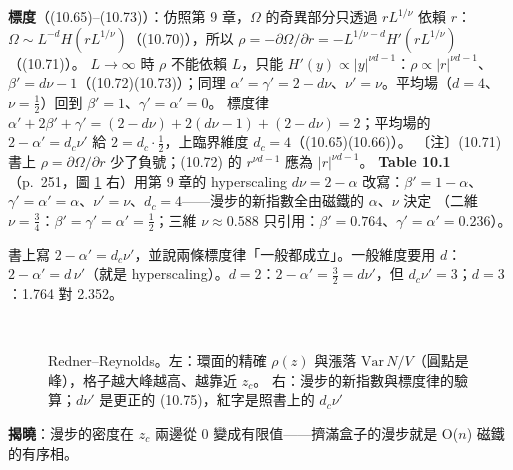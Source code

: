 \textbf{標度}（(10.65)--(10.73)）：仿照第 9 章，$\Omega$ 的奇異部分只透過 $rL^{1/\nu}$ 依賴 $r$：$\Omega\sim L^{-d}H(rL^{1/\nu})$（(10.70)），所以 $\rho=-\partial\Omega/\partial r=-L^{1/\nu-d}H'(rL^{1/\nu})$（(10.71)）。
$L\to\infty$ 時 $\rho$ 不能依賴 $L$，只能 $H'(y)\propto|y|^{\nu d-1}$：$\rho\propto|r|^{\nu d-1}$、$\beta'=d\nu-1$（(10.72)(10.73)）；同理 $\alpha'=\gamma'=2-d\nu$、$\nu'=\nu$。平均場（$d=4$、$\nu=\frac12$）回到 $\beta'=1$、$\gamma'=\alpha'=0$。
標度律 $\alpha'+2\beta'+\gamma'=(2-d\nu)+2(d\nu-1)+(2-d\nu)=2$；平均場的 $2-\alpha'=d_c\nu'$ 給 $2=d_c\cdot\frac12$，上臨界維度 $d_c=4$（(10.65)(10.66)）。
〔注〕(10.71) 書上 $\rho=\partial\Omega/\partial r$ 少了負號；(10.72) 的 $r^{\nu d-1}$ 應為 $|r|^{\nu d-1}$。
\textbf{Table 10.1}（p.~251，圖 \ref{ten-fig-rr} 右）用第 9 章的 hyperscaling $d\nu=2-\alpha$ 改寫：$\beta'=1-\alpha$、$\gamma'=\alpha'=\alpha$、$\nu'=\nu$、$d_c=4$——漫步的新指數全由磁鐵的 $\alpha$、$\nu$ 決定
（二維 $\nu=\frac34$：$\beta'=\gamma'=\alpha'=\frac12$；三維 $\nu\approx0.588$ 只引用：$\beta'=0.764$、$\gamma'=\alpha'=0.236$）。
\begin{errbox}[p.~251，(10.75)]
書上寫 $2-\alpha'=d_c\nu'$，並說兩條標度律「一般都成立」。一般維度要用 $d$：$2-\alpha'=d\,\nu'$（就是 hyperscaling）。$d=2$：$2-\alpha'=\frac32=d\nu'$，但 $d_c\nu'=3$；$d=3$：1.764 對 2.352。
\end{errbox}

\begin{figure}[htbp]
\centering
\begin{minipage}[c]{0.46\linewidth}\centering\TenFigRho\\[6pt]\footnotesize\setlength{\tabcolsep}{2.5pt}\TenTabRho\end{minipage}\hfill
\begin{minipage}[c]{0.52\linewidth}\centering\footnotesize\setlength{\tabcolsep}{3pt}\TenTabExp\end{minipage}
\caption{Redner--Reynolds。左：環面的精確 $\rho(z)$ 與漲落 $\mathrm{Var}\,N/V$（圓點是峰），格子越大峰越高、越靠近 $z_c$。
右：漫步的新指數與標度律的驗算；$d\nu'$ 是更正的 (10.75)，紅字是照書上的 $d_c\nu'$}\label{ten-fig-rr}
\end{figure}

\textbf{揭曉}：漫步的密度在 $z_c$ 兩邊從 0 變成有限值——擠滿盒子的漫步就是 O($n$) 磁鐵的有序相。

